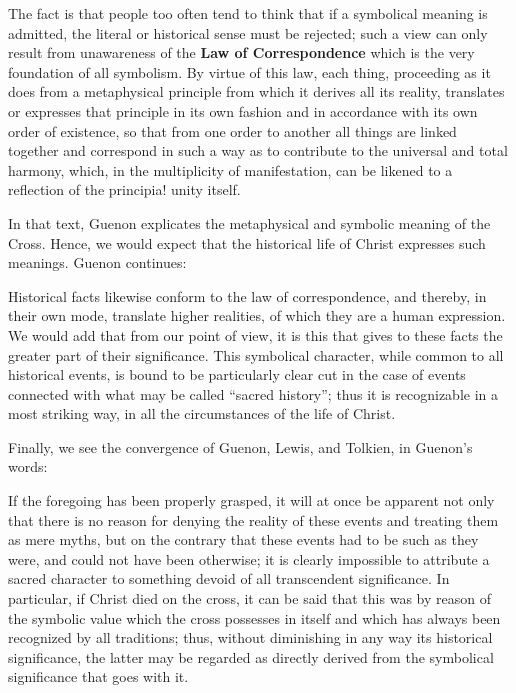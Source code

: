 \begin{quotex}
The fact is that people too often tend to think that if a symbolical meaning is admitted, the literal or historical sense must be rejected; such a view can only result from unawareness of the \textbf{Law of Correspondence} which is the very foundation of all symbolism. By virtue of this law, each thing, proceeding as it does from a metaphysical principle from which it derives all its reality, translates or expresses that principle in its own fashion and in accordance with its own order of existence, so that from one order to another all things are linked together and correspond in such a way as to contribute to the universal and total harmony, which, in the multiplicity of manifestation, can be likened to a reflection of the principia! unity itself.
\end{quotex}


In that text, Guenon explicates the metaphysical and symbolic meaning of the Cross. Hence, we would expect that the historical life of Christ expresses such meanings. Guenon continues:

\begin{quotex}
Historical facts likewise conform to the law of correspondence, and thereby, in their own mode, translate higher realities, of which they are a human expression. We would add that from our point of view, it is this that gives to these facts the greater part of their significance. This symbolical character, while common to all historical events, is bound to be particularly clear cut in the case of events connected with what may be called ``sacred history''; thus it is recognizable in a most striking way, in all the circumstances of the life of Christ.
\end{quotex}


Finally, we see the convergence of Guenon, Lewis, and Tolkien, in Guenon's words:

\begin{quotex}
If the foregoing has been properly grasped, it will at once be apparent not only that there is no reason for denying the reality of these events and treating them as mere myths, but on the contrary that these events had to be such as they were, and could not have been otherwise; it is clearly impossible to attribute a sacred character to something devoid of all transcendent significance. In particular, if Christ died on the cross, it can be said that this was by reason of the symbolic value which the cross possesses in itself and which has always been recognized by all traditions; thus, without diminishing in any way its historical significance, the latter may be regarded as directly derived from the symbolical significance that goes with it.
\end{quotex}

